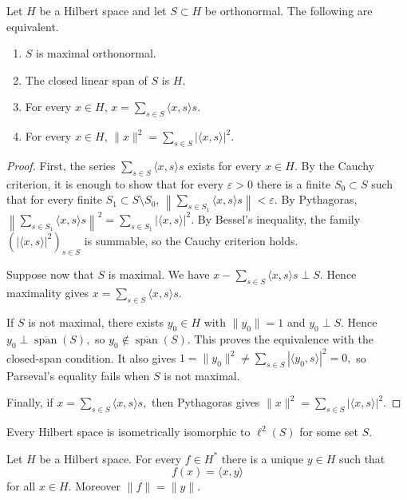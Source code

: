 \begin{theorem}[Parseval]
\label{theorem-parseval}
Let $H$ be a Hilbert space and let $S\subset
H$ be orthonormal. The following are
equivalent.
\begin{enumerate}
\item $S$ is maximal orthonormal.
\item The closed linear span of $S$ is $H$.
\item For every $x\in H$,
$
x=\sum_{s\in S}\langle x,s\rangle s.
$
\item For every $x\in H$,
$
\|x\|^2=\sum_{s\in S}|\langle x,s\rangle|^2.
$
\end{enumerate}
\end{theorem}

\begin{proof}
First, the series
$
\sum_{s\in S}\langle x,s\rangle s
$
exists for every $x\in H$. By the Cauchy
criterion, it is enough to show that for
every $\varepsilon>0$ there is a finite
$S_0\subset S$ such that for every finite
$S_1\subset S\setminus S_0$,
$
\left\|\sum_{s\in S_1}
\langle x,s\rangle s\right\|<\varepsilon.
$
By Pythagoras,
$
\left\|\sum_{s\in S_1}
\langle x,s\rangle s\right\|^2
=
\sum_{s\in S_1}|\langle x,s\rangle|^2.
$
By Bessel's inequality, the family
$(|\langle x,s\rangle|^2)_{s\in S}$ is
summable, so the Cauchy criterion holds.

Suppose now that $S$ is maximal. We have
$
x-\sum_{s\in S}\langle x,s\rangle s
\perp S.
$
Hence maximality gives
$
x=\sum_{s\in S}\langle x,s\rangle s.
$

If $S$ is not maximal, there exists
$y_0\in H$ with $\|y_0\|=1$ and
$y_0\perp S$. Hence
$
y_0\perp\overline{\operatorname{span}}(S),
$
so
$y_0\notin\overline{\operatorname{span}}(S)$.
This proves the equivalence with the
closed-span condition. It also gives
$
1=\|y_0\|^2
\neq
\sum_{s\in S}|\langle y_0,s\rangle|^2=0,
$
so Parseval's equality fails when $S$ is not
maximal.

Finally, if
$
x=\sum_{s\in S}\langle x,s\rangle s,
$
then Pythagoras gives
$
\|x\|^2=
\sum_{s\in S}|\langle x,s\rangle|^2.
$
\end{proof}



\begin{proposition}
\label{proposition-hilbert-is-l2-set}
Every Hilbert space is isometrically
isomorphic to $\ell^2(S)$ for some set $S$.
\end{proposition}

\begin{theorem}
\label{theorem-riesz-representation-hilbert}
Let $H$ be a Hilbert space. For every $f\in
H^*$ there is a unique $y\in H$ such that
$$
f(x)=\langle x,y\rangle
$$
for all $x\in H$. Moreover $\|f\|=\|y\|$.
\end{theorem}

